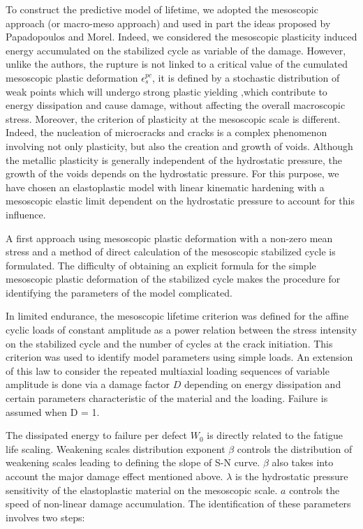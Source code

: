 To construct the predictive model of lifetime, we adopted the mesoscopic approach (or macro-meso approach) and used in part the ideas proposed by Papadopoulos and Morel. Indeed, we considered the mesoscopic plasticity induced energy accumulated on the stabilized cycle as variable of the damage. However, unlike the authors, the rupture is not linked to a critical value of the cumulated mesoscopic plastic deformation $\epsilon^{pc}_s$, it is defined by a stochastic distribution of weak points which will undergo strong plastic yielding ,which contribute to energy dissipation and cause
damage, without affecting the overall macroscopic stress. Moreover, the criterion of plasticity at the mesoscopic scale is different. Indeed, the nucleation of microcracks and cracks is a complex phenomenon involving not only plasticity, but also the creation and growth of voids. Although the metallic plasticity is generally independent of the hydrostatic pressure, the growth of the voids depends on the hydrostatic pressure. For this purpose, we have chosen an elastoplastic model with linear kinematic hardening with a mesoscopic elastic limit dependent on the hydrostatic pressure to account for this influence.

A first approach using mesoscopic plastic deformation with a non-zero mean stress and a method of direct calculation of the mesoscopic stabilized cycle is formulated. The difficulty of obtaining an explicit formula for the simple mesoscopic plastic deformation of the stabilized cycle makes the procedure for identifying the parameters of the model complicated. 

In limited endurance, the mesoscopic lifetime criterion was defined for the affine cyclic loads of constant amplitude as a power relation between the stress intensity on the stabilized cycle and the number of cycles at the crack initiation. This criterion was used to identify model parameters using simple loads. An extension of this law to consider the repeated multiaxial loading sequences of variable amplitude is done via a damage factor $D$ depending on energy dissipation and certain parameters characteristic of the material and the loading. Failure is assumed when D = 1.


The dissipated energy to failure per defect  $W_0$ is directly related to the fatigue life scaling. Weakening scales distribution exponent  $\beta$ controls the distribution of weakening scales leading to defining the slope of S-N curve. $\beta$ also takes into account the major damage effect mentioned above.  $\lambda$ is the hydrostatic pressure sensitivity of the elastoplastic material on the mesoscopic scale.  $a$ controls the speed of non-linear damage accumulation. The identification of these parameters involves two steps:


